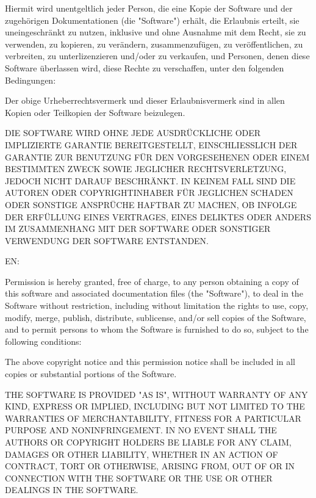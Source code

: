 \documentclass[]{article}
\begin{document}
Hiermit wird unentgeltlich jeder Person, die eine Kopie der Software und
der zugehörigen Dokumentationen (die "Software") erhält, die Erlaubnis
erteilt, sie uneingeschränkt zu nutzen, inklusive und ohne Ausnahme mit
dem Recht, sie zu verwenden, zu kopieren, zu verändern, zusammenzufügen,
zu veröffentlichen, zu verbreiten, zu unterlizenzieren und/oder zu
verkaufen, und Personen, denen diese Software überlassen wird, diese
Rechte zu verschaffen, unter den folgenden Bedingungen:

Der obige Urheberrechtsvermerk und dieser Erlaubnisvermerk sind in allen
Kopien oder Teilkopien der Software beizulegen.

DIE SOFTWARE WIRD OHNE JEDE AUSDRÜCKLICHE ODER IMPLIZIERTE GARANTIE
BEREITGESTELLT, EINSCHLIESSLICH DER GARANTIE ZUR BENUTZUNG FÜR DEN
VORGESEHENEN ODER EINEM BESTIMMTEN ZWECK SOWIE JEGLICHER
RECHTSVERLETZUNG, JEDOCH NICHT DARAUF BESCHRÄNKT. IN KEINEM FALL SIND
DIE AUTOREN ODER COPYRIGHTINHABER FÜR JEGLICHEN SCHADEN ODER SONSTIGE
ANSPRÜCHE HAFTBAR ZU MACHEN, OB INFOLGE DER ERFÜLLUNG EINES VERTRAGES,
EINES DELIKTES ODER ANDERS IM ZUSAMMENHANG MIT DER SOFTWARE ODER
SONSTIGER VERWENDUNG DER SOFTWARE ENTSTANDEN.

EN:

Permission is hereby granted, free of charge, to any person obtaining a
copy of this software and associated documentation files (the
"Software"), to deal in the Software without restriction, including
without limitation the rights to use, copy, modify, merge, publish,
distribute, sublicense, and/or sell copies of the Software, and to
permit persons to whom the Software is furnished to do so, subject to
the following conditions:

The above copyright notice and this permission notice shall be included
in all copies or substantial portions of the Software.

THE SOFTWARE IS PROVIDED "AS IS", WITHOUT WARRANTY OF ANY KIND, EXPRESS
OR IMPLIED, INCLUDING BUT NOT LIMITED TO THE WARRANTIES OF
MERCHANTABILITY, FITNESS FOR A PARTICULAR PURPOSE AND NONINFRINGEMENT.
IN NO EVENT SHALL THE AUTHORS OR COPYRIGHT HOLDERS BE LIABLE FOR ANY
CLAIM, DAMAGES OR OTHER LIABILITY, WHETHER IN AN ACTION OF CONTRACT,
TORT OR OTHERWISE, ARISING FROM, OUT OF OR IN CONNECTION WITH THE
SOFTWARE OR THE USE OR OTHER DEALINGS IN THE SOFTWARE.
\end{document}
